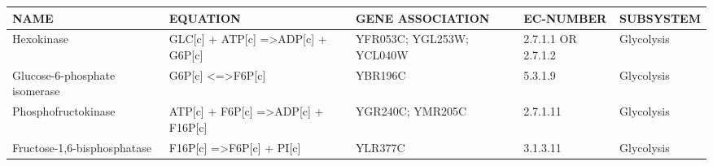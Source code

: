 {\tiny
\begin{landscape}                              %
\begin{longtable}{p{.25\linewidth} | p{.40\linewidth} | p{.19\linewidth} | p{.05\linewidth} | p{.10\linewidth}}
\textbf{NAME} & \textbf{EQUATION} & \textbf{GENE ASSOCIATION} & \textbf{EC-NUMBER} & \textbf{SUBSYSTEM}                                                          \\ \hline

\hline
\endhead               %

Hexokinase                                                                                & GLC{[}c{]} + ATP{[}c{]} =\textgreater ADP{[}c{]} + G6P{[}c{]}                                                                                   & YFR053C; YGL253W; YCL040W                                                                                                                                        & 2.7.1.1 OR 2.7.1.2 & Glycolysis                                                                  \\
Glucose-6-phosphate isomerase                                                             & G6P{[}c{]} \textless{}=\textgreater F6P{[}c{]}                                                                                                  & YBR196C                                                                                                                                                          & 5.3.1.9            & Glycolysis                                                                  \\
Phosphofructokinase                                                                       & ATP{[}c{]} + F6P{[}c{]} =\textgreater ADP{[}c{]} + F16P{[}c{]}                                                                                  & YGR240C; YMR205C                                                                                                                                                 & 2.7.1.11           & Glycolysis                                                                  \\
Fructose-1,6-bisphosphatase                                                               & F16P{[}c{]} =\textgreater F6P{[}c{]} + PI{[}c{]}                                                                                                & YLR377C                                                                                                                                                          & 3.1.3.11           & Glycolysis                                                                  \\

\end{longtable}
\end{landscape}}
